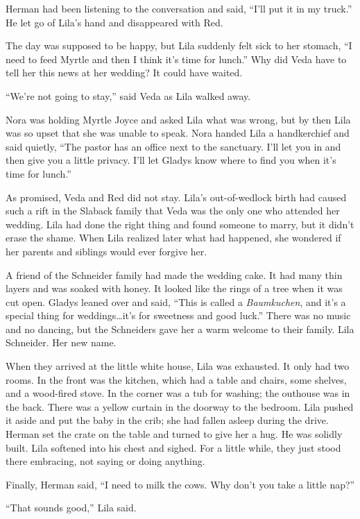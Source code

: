 \documentclass[
  american,
  letterpaper,
]{book}
\begin{document}
Herman had been listening to the conversation and said, ``I'll put it in
my truck.'' He let go of Lila's hand and disappeared with Red.

The day was supposed to be happy, but Lila suddenly felt sick to her
stomach, ``I need to feed Myrtle and then I think it's time for lunch.''
Why did Veda have to tell her this news at her wedding? It could have
waited.

``We're not going to stay,'' said Veda as Lila walked away.

Nora was holding Myrtle Joyce and asked Lila what was wrong, but by then
Lila was so upset that she was unable to speak. Nora handed Lila a
handkerchief and said quietly, ``The pastor has an office next to the
sanctuary. I'll let you in and then give you a little privacy. I'll let
Gladys know where to find you when it's time for lunch.''

As promised, Veda and Red did not stay. Lila's out-of-wedlock birth had
caused such a rift in the Slaback family that Veda was the only one who
attended her wedding. Lila had done the right thing and found someone to
marry, but it didn't erase the shame. When Lila realized later what had
happened, she wondered if her parents and siblings would ever forgive
her.

A friend of the Schneider family had made the wedding cake. It had many
thin layers and was soaked with honey. It looked like the rings of a
tree when it was cut open. Gladys leaned over and said, ``This is called
a \emph{Baumkuchen}, and it's a special thing for weddings\ldots it's
for sweetness and good luck.'' There was no music and no dancing, but
the Schneiders gave her a warm welcome to their family. Lila Schneider.
Her new name.

When they arrived at the little white house, Lila was exhausted. It only
had two rooms. In the front was the kitchen, which had a table and
chairs, some shelves, and a wood-fired stove. In the corner was a tub
for washing; the outhouse was in the back. There was a yellow curtain in
the doorway to the bedroom. Lila pushed it aside and put the baby in the
crib; she had fallen asleep during the drive. Herman set the crate on
the table and turned to give her a hug. He was solidly built. Lila
softened into his chest and sighed. For a little while, they just stood
there embracing, not saying or doing anything.

Finally, Herman said, ``I need to milk the cows. Why don't you take a
little nap?''

``That sounds good,'' Lila said.
\end{document}

